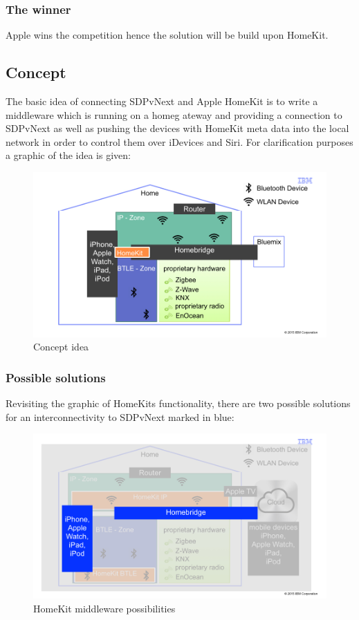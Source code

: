 		\subsubsection{The winner}
				Apple wins the competition hence the solution will be build upon HomeKit.

		\pagebreak

	\subsection{Concept} 
		The basic idea of connecting SDPvNext and Apple HomeKit is to write a middleware which is running on a homeg ateway and providing a connection to SDPvNext as well as pushing the devices with HomeKit meta data into the local network in order to control them over iDevices and Siri. For clarification purposes a graphic of the idea is given:


		\begin{figure}[h]
				\centering
					\includegraphics[width=.9\textwidth]{images/praxis/ConceptIdea.jpg}
				\caption{Concept idea}
				\label{fig:ConceptIdea}
		\end{figure}

		\pagebreak

		\subsubsection{Possible solutions}
			Revisiting the graphic of HomeKits functionality, there are two possible solutions for an interconnectivity to SDPvNext marked in blue:

			\begin{figure}[h]
				\centering
					\includegraphics[width=.9\textwidth]{images/praxis/MiddlewarePossibilities.jpg}
				\caption{HomeKit middleware possibilities}
				\label{fig:SmartHomeLandscape}
			\end{figure} 

